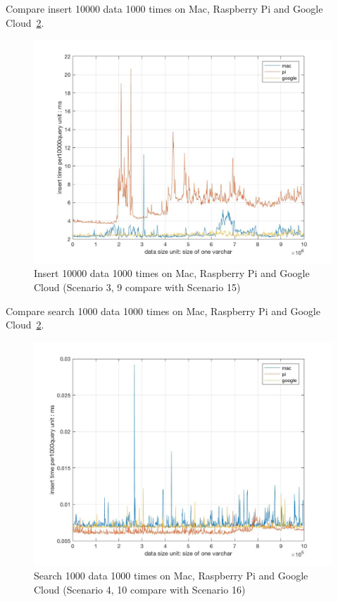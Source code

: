 Compare insert 10000 data 1000 times on Mac, Raspberry Pi and Google 
Cloud~\ref{f:fly}.

\begin{figure}[!ht]
  \centering\includegraphics[width=\columnwidth]
  {images/insert_comp_10000_three.jpg}
  \caption{Insert 10000 data 1000 times on  Mac, Raspberry Pi and Google Cloud
  (Scenario 3, 9 compare with Scenario 15)}\label{f:fly}
\end{figure}

Compare search 1000 data 1000 times on Mac, Raspberry Pi and Google
 Cloud~\ref{f:fly}.

\begin{figure}[!ht]
  \centering\includegraphics[width=\columnwidth]
  {images/search_comp_1000_three.jpg}
  \caption{Search 1000 data 1000 times on  Mac, Raspberry Pi and Google Cloud
  (Scenario 4, 10 compare with Scenario 16)}\label{f:fly}
\end{figure}


